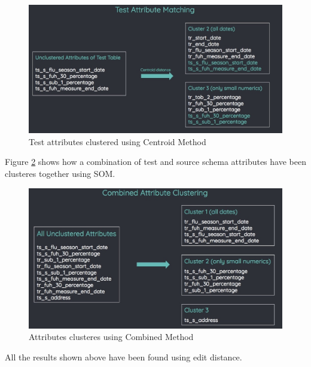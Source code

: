 \documentclass[conference]{IEEEtran}
\begin{document}
\begin{figure}[h]
\centering
\includegraphics[scale=0.25]{test.jpeg}
\caption{Test attributes clustered using Centroid Method}
\label{test_centroid}
\end{figure}

Figure \ref{combined} shows how a combination of test and source schema attributes have been clusteres together using SOM.\\

\begin{figure}
\centering
\includegraphics[scale=0.25]{combined.jpeg}
\caption{Attributes clusteres using Combined Method}
\label{combined}
\end{figure}

All the results shown above have been found using edit distance.
\end{document}
